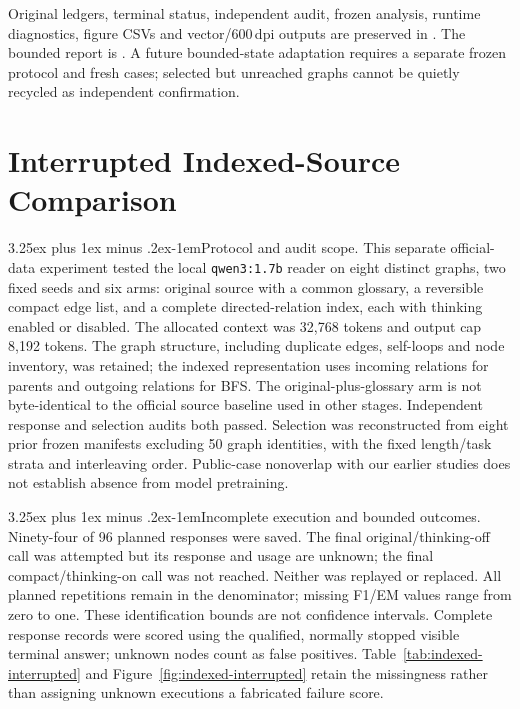 \documentclass[10pt]{article}
\makeatletter
\renewcommand\paragraph{\@startsection{paragraph}{4}{\parindent}%
  {3.25ex plus 1ex minus .2ex}{-1em}{\normalfont\normalsize\bfseries}}
\makeatother
\begin{document}
Original ledgers, terminal status, independent audit, frozen analysis, runtime diagnostics, figure CSVs and vector/600\,dpi outputs are preserved in \protect{}. The bounded report is \protect{}. A future bounded-state adaptation requires a separate frozen protocol and fresh cases; selected but unreached graphs cannot be quietly recycled as independent confirmation.

\section{Interrupted Indexed-Source Comparison}
\label{app:indexed-source}

\paragraph{Protocol and audit scope.} This separate official-data experiment tested the local \texttt{qwen3:\allowbreak1.7b} reader on eight distinct graphs, two fixed seeds and six arms: original source with a common glossary, a reversible compact edge list, and a complete directed-relation index, each with thinking enabled or disabled. The allocated context was 32,768 tokens and output cap 8,192 tokens. The graph structure, including duplicate edges, self-loops and node inventory, was retained; the indexed representation uses incoming relations for parents and outgoing relations for BFS. The original-plus-glossary arm is not byte-identical to the official source baseline used in other stages. Independent response and selection audits both passed. Selection was reconstructed from eight prior frozen manifests excluding 50 graph identities, with the fixed length/task strata and interleaving order. Public-case nonoverlap with our earlier studies does not establish absence from model pretraining.

\paragraph{Incomplete execution and bounded outcomes.} Ninety-four of 96 planned responses were saved. The final original/thinking-off call was attempted but its response and usage are unknown; the final compact/thinking-on call was not reached. Neither was replayed or replaced. All planned repetitions remain in the denominator; missing F1/EM values range from zero to one. These identification bounds are not confidence intervals. Complete response records were scored using the qualified, normally stopped visible terminal answer; unknown nodes count as false positives. Table~\ref{tab:indexed-interrupted} and Figure~\ref{fig:indexed-interrupted} retain the missingness rather than assigning unknown executions a fabricated failure score.
\end{document}
